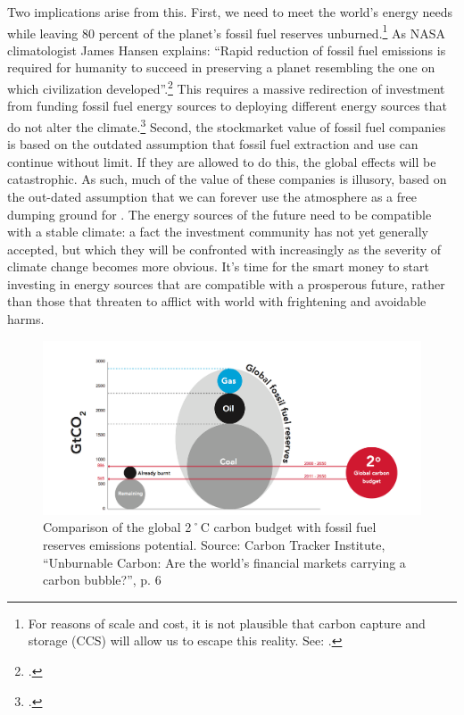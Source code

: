 Two implications arise from this. 
First, we need to meet the world's energy needs while leaving 80 percent of the planet's fossil fuel reserves unburned.\footnote{For reasons of scale and cost, it is not plausible that carbon capture and storage (CCS) will allow us to escape this reality. See: .} 
As NASA climatologist James Hansen explains: ``Rapid reduction of fossil fuel emissions is required for humanity to
succeed in preserving a planet resembling the one on which civilization developed''.\footcite[][]{HansenPaleo}
This requires a massive redirection of investment from funding fossil fuel energy sources to deploying different energy sources that do not alter the climate.\footcite[See: ][]{SternEuropeanLowCarbon}
Second, the stockmarket value of fossil fuel companies is based on the outdated assumption that fossil fuel extraction and use can continue without limit.
If they are allowed to do this, the global effects will be catastrophic.
As such, much of the value of these companies is illusory, based on the out-dated assumption that we can forever use the atmosphere as a free dumping ground for .
The energy sources of the future need to be compatible with a stable climate: a fact the investment community has not yet generally accepted, but which they will be confronted with increasingly as the severity of climate change becomes more obvious.
It's time for the smart money to start investing in energy sources that are compatible with a prosperous future, rather than those that threaten to afflict with world with frightening and avoidable harms.



\begin{figure}
\includegraphics[width=\textwidth]{s1-carbon-budget.png}
\centering
\caption{Comparison of the global 2˚C carbon budget with fossil fuel reserves  emissions potential. Source: Carbon Tracker Institute, ``Unburnable Carbon: Are the world's financial markets carrying a carbon bubble?'', p. 6}
\label{fig:TwoDegreeBudget}
\end{figure}



